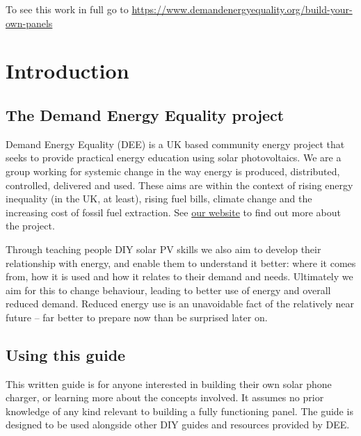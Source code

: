 \documentclass{article}
\theoremstyle{definition}
\theoremstyle{definition}
\theoremstyle{remark}
\begin{document}
    To see this work in full go to \href{https://www.demandenergyequality.org/build-your-own-panels}{https://www.demandenergyequality.org/build-your-own-panels}
  


\newpage

\section{Introduction} %
\label{sec:introduction}

  \subsection{The Demand Energy Equality project} %
  \label{sub:the_demand_energy_equality_project}

    Demand Energy Equality (DEE) is a UK based community energy project that seeks to provide practical energy education using solar photovoltaics. We are a group working for systemic change in the way energy is produced, distributed, controlled, delivered and used. These aims are within the context of rising energy inequality (in the UK, at least), rising fuel bills, climate change and the increasing cost of fossil fuel extraction. See \href{https://www.demandenergyequality.org/about/}{our website} to find out more about the project.

    Through teaching people DIY solar PV skills we also aim to develop their relationship with energy, and enable them to understand it better: where it comes from, how it is used and how it relates to their demand and needs. Ultimately we aim for this to change behaviour, leading to better use of energy and overall reduced demand. Reduced energy use is an unavoidable fact of the relatively near future – far better to prepare now than be surprised later on.

  
  \subsection{Using this guide} %
  \label{sub:using_this_guide}

    This written guide is for anyone interested in building their own solar phone charger, or learning more about the concepts involved. It assumes no prior knowledge of any kind relevant to building a fully functioning panel. The guide is designed to be used alongside other DIY guides and resources provided by DEE. 
\end{document}
